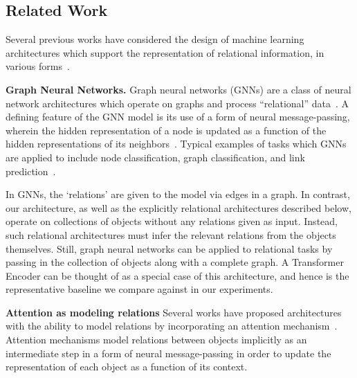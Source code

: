 \subsection{Related Work}

Several previous works have considered the design of machine learning architectures which support the representation of relational information, in various forms~\citep{battagliaRelationalInductiveBiases2018,palmRecurrentRelationalNetworks2018,zhangRAVENDatasetRelational2019}.

\textbf{Graph Neural Networks.} Graph neural networks (GNNs) are a class of neural network architectures which operate on graphs and process ``relational'' data~\citep{niepertLearningConvolutionalNeural2016,kipfSemiSupervisedClassificationGraph2017,schlichtkrullModelingRelationalData2017,velickovicGraphAttentionNetworks2017,kipfNeuralRelationalInference2018}. A defining feature of the GNN model is its use of a form of neural message-passing, wherein the hidden representation of a node is updated as a function of the hidden representations of its neighbors~\citep{gilmerNeuralMessagePassing2017}. Typical examples of tasks which GNNs are applied to include node classification, graph classification, and link prediction~\citep{hamiltonGraphRepresentationLearning2020}. %

In GNNs, the `relations' are given to the model via edges in a graph. In contrast, our architecture, as well as the explicitly relational architectures described below, operate on collections of objects without any relations given as input. Instead, such relational architectures must infer the relevant relations from the objects themselves. Still, graph neural networks can be applied to relational tasks by passing in the collection of objects along with a complete graph. A Transformer Encoder can be thought of as a special case of this architecture, and hence is the representative baseline we compare against in our experiments.

\textbf{Attention as modeling relations} Several works have proposed architectures with the ability to model relations by incorporating an attention mechanism~\citep{vaswani2017attention,locatelloObjectCentricLearningSlot2020,santoroRelationalRecurrent2018,zambaldiDeepReinforcementLearning2018,velickovicGraphAttentionNetworks2017}. Attention mechanisms model relations between objects implicitly as an intermediate step in a form of neural message-passing in order to update the representation of each object as a function of its context.

